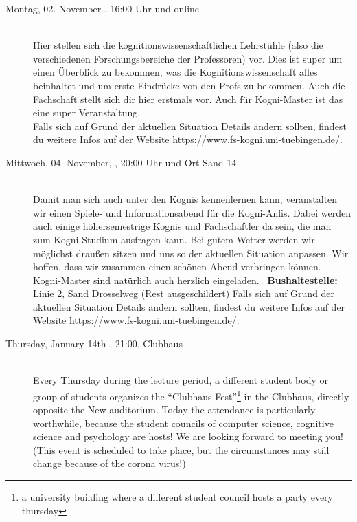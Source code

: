 \begin{description}
\ifkogwiss
\item[Montag, 02. November \YEAR, 16:00 Uhr und online]\ \\
    Hier stellen sich die kognitionswissenschaftlichen Lehrstühle (also die verschiedenen Forschungsbereiche der Professoren) vor. Dies ist super um einen Überblick zu bekommen, was die Kognitionswissenschaft alles beinhaltet und um erste Eindrücke von den Profs zu bekommen. Auch die Fachschaft stellt sich dir hier erstmals vor. %
    Auch für Kogni-Master ist das eine super Veranstaltung. \\
    Falls sich auf Grund der aktuellen Situation Details ändern sollten, findest du weitere Infos auf der Website \url{https://www.fs-kogni.uni-tuebingen.de/}.
    
\fi

\ifkogwiss
    \item[Mittwoch, 04. November, \YEAR, 20:00 Uhr und Ort Sand 14]\ \\
         Damit man sich auch unter den Kognis kennenlernen kann, veranstalten wir einen Spiele- und Informationsabend für die Kogni-Anfis. Dabei werden auch einige höhersemestrige Kognis und Fachschaftler da sein, die man zum Kogni-Studium ausfragen kann. Bei gutem Wetter werden wir möglichst draußen sitzen und uns so der aktuellen Situation anpassen. Wir hoffen, dass wir zusammen einen schönen Abend verbringen können. Kogni-Master sind natürlich auch herzlich eingeladen.
	~\textbf{Bushaltestelle:} Linie 2, Sand Drosselweg (Rest ausgeschildert)
	Falls sich auf Grund der aktuellen Situation Details ändern sollten, findest du weitere Infos auf der Website \url{https://www.fs-kogni.uni-tuebingen.de/}.
\fi

\ifml
    \item[Thursday, January 14th \YEAR, 21:00, Clubhaus]\ \\
        Every Thursday during the lecture period, a different student body or group of students organizes the "`Clubhaus Fest"'\footnote{a university building where a different student council hosts a party every thursday} in the Clubhaus, directly opposite the New auditorium. Today the attendance is particularly worthwhile, because the student councils of computer science, cognitive science and psychology are hosts! We are looking forward to meeting you!(This event is scheduled to take place, but the circumstances may still change because of the corona virus!)


\end{description}
